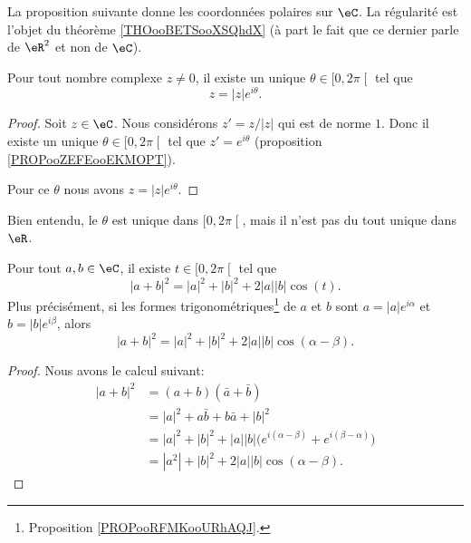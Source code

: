 La proposition suivante donne les coordonnées polaires sur \( \eC\). La régularité est l'objet du théorème \ref{THOooBETSooXSQhdX} (à part le fait que ce dernier parle de \( \eR^2\) et non de \( \eC\)).
\begin{proposition}     \label{PROPooRFMKooURhAQJ}
	Pour tout nombre complexe \( z\neq 0\), il existe un unique \( \theta\in\mathopen[ 0 , 2\pi \mathclose[\) tel que
	\begin{equation}
		z=| z | e^{i\theta}.
	\end{equation}
\end{proposition}

\begin{proof}
	Soit \( z\in \eC\). Nous considérons \( z'=z/| z |\) qui est de norme \( 1\). Donc il existe un unique \( \theta\in\mathopen[ 0 , 2\pi \mathclose[\) tel que \( z'= e^{i\theta}\) (proposition \ref{PROPooZEFEooEKMOPT}).

	Pour ce \( \theta\) nous avons \( z=| z | e^{i\theta}\).
\end{proof}
Bien entendu, le \( \theta\) est unique dans \( \mathopen[ 0 , 2\pi \mathclose[\), mais il n'est pas du tout unique dans \( \eR\).


\begin{lemma}        \label{LEMooOQKNooGZlJHf}
	Pour tout \( a,b\in \eC\), il existe \( t\in \mathopen[ 0 , 2\pi \mathclose[\) tel que
	\begin{equation}
		| a+b |^2=| a |^2+| b |^2+2| a || b |\cos(t).
	\end{equation}
	Plus précisément, si les formes trigonométriques\footnote{Proposition \ref{PROPooRFMKooURhAQJ}.} de \( a\) et \( b\) sont \( a=| a | e^{i\alpha}\) et \( b=| b | e^{i\beta}\), alors
	\begin{equation}
		| a+b |^2=| a |^2+| b |^2+2| a || b |\cos(\alpha-\beta).
	\end{equation}
\end{lemma}

\begin{proof}
	Nous avons le calcul suivant:
	\begin{subequations}
		\begin{align}
			| a+b |^2 & =(a+b)(\bar a+\bar b)                                                            \\
			          & =| a |^2+a\bar b+b\bar a+| b |^2                                                 \\
			          & =| a |^2+| b |^2+| a | |b |\big(  e^{i(\alpha-\beta)}+ e^{i(\beta-\alpha)} \big) \\
			          & =| a^2 |+| b |^2+2| a | |b |\cos(\alpha-\beta).
		\end{align}
	\end{subequations}
\end{proof}

